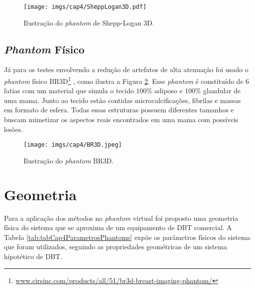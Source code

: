 \begin{figure}[H]
	\caption{Ilustração do \textit{phantom} de Shepp-Logan \acs{3D}.}
	\begin{center}
		\texttt{[image: imgs/cap4/SheppLogan3D.pdf]}
	\end{center}
	\label{fig:imgCap4SheppLogan3D}
\end{figure} 

\subsection{\textit{Phantom} Físico}

Já para os testes envolvendo a redução de artefatos de alta atenuação foi usado o \textit{phantom} físico BR3D\footnote{\url{www.cirsinc.com/products/all/51/br3d-breast-imaging-phantom/}} \cite{PhantomBR3D}, como ilustra a Figura \ref{fig:imgCap4BR3D}. Esse \textit{phantom} é constituído de 6 fatias com um material que simula o tecido $100\%$ adiposo e $100\%$ glandular de uma mama. Junto ao tecido estão contidas microcalcificações, fibrilas e massas em formato de esfera. Todas essas estruturas possuem diferentes tamanhos e buscam mimetizar os aspectos reais encontrados em uma mama com possíveis lesões.   

\begin{figure}[H]
	\caption{Ilustração do \textit{phantom} BR3D.}
	\begin{center}
		\texttt{[image: imgs/cap4/BR3D.jpeg]}
	\end{center}
	\label{fig:imgCap4BR3D}
\end{figure} 
   

\section{Geometria} 

 
Para a aplicação dos métodos no \textit{phantom} virtual foi proposto uma geometria física do sistema que se aproxima de um equipamento de \acs{DBT} comercial. A Tabela \ref{tab:tabCap4ParametrosPhantoms} expõe os parâmetros físicos do sistema que foram utilizados, seguindo as propriedades geométricas de um sistema hipotético de \acs{DBT}. %

